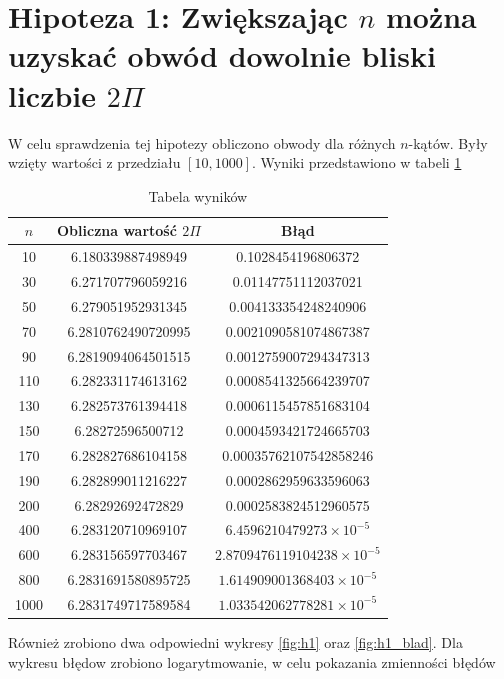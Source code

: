 \documentclass[12pt,a4paper]{article}
\begin{document}
\newpage

\section{Hipoteza 1: Zwiększając $n$ można uzyskać obwód dowolnie bliski liczbie $2\Pi$}

W celu sprawdzenia tej hipotezy obliczono obwody dla różnych $n$-kątów. Były wzięty wartości z przedziału $[10, 1000]$. Wyniki przedstawiono w tabeli \ref{tab:h1_res}


\begin{table}[htb]
    \centering
    \begin{tabular}{ | c | c | c |}
    \hline
    {$n$} & {Obliczna wartość $2\Pi$} & {Błąd} \\
    \hline
    10 & 6.180339887498949 & 0.1028454196806372 \\
    30 & 6.271707796059216 & 0.01147751112037021 \\
    50 & 6.279051952931345 & 0.004133354248240906 \\
    70 & 6.2810762490720995 & 0.0021090581074867387 \\
    90 & 6.2819094064501515 & 0.0012759007294347313 \\
    110 & 6.282331174613162 & 0.0008541325664239707 \\
    130 & 6.282573761394418 & 0.0006115457851683104 \\
    150 & 6.28272596500712 & 0.0004593421724665703 \\
    170 & 6.282827686104158 & 0.00035762107542858246 \\
    190 & 6.282899011216227 & 0.0002862959633596063 \\
    200 & 6.28292692472829 & 0.0002583824512960575 \\
    400 & 6.283120710969107 & $6.4596210479273 \times 10^{-5}$ \\
    600 & 6.283156597703467 & $2.8709476119104238 \times 10^{-5}$ \\
    800 & 6.2831691580895725 & $1.614909001368403 \times 10^{-5}$ \\
    1000 & 6.2831749717589584 & $1.033542062778281 \times 10^{-5}$\\
    \hline
    \end{tabular}
    \caption{Tabela wyników}
    \label{tab:h1_res}
\end{table}


Również zrobiono dwa odpowiedni wykresy \ref{fig:h1} oraz \ref{fig:h1_blad}. Dla wykresu błędow zrobiono logarytmowanie, w celu pokazania zmienności błędów
\end{document}
